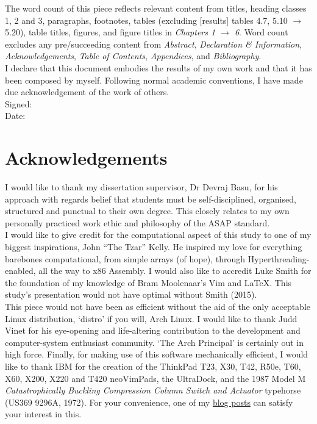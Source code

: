\documentclass[11pt, english]{article}
\begin{document}
	The word count of this piece reflects relevant content from titles, heading classes 1, 2 and 3, paragraphs, footnotes, tables (excluding [results] tables 4.7, 5.10 $\rightarrow$ 5.20), table titles, figures, and figure titles in \textit{Chapters 1 $\rightarrow$ 6}. Word count excludes any pre/succeeding content from \textit{Abstract}, \textit{Declaration \& Information}, \textit{Acknowledgements}, \textit{Table of Contents}, \textit{Appendices}, and \textit{Bibliography}.\\

	I declare that this document embodies the results of my own work and that it has been composed by myself. Following normal academic conventions, I have made due acknowledgement of the work of others.\\

	Signed:\\ 

	Date:

\newpage

	\section*{Acknowledgements}

I would like to thank my dissertation supervisor, Dr Devraj Basu, for his approach with regards belief that students must be self-disciplined, organised, structured and punctual to their own degree. This closely relates to my own personally practiced work ethic and philosophy of the ASAP standard.\\

I would like to give credit for the computational aspect of this study to one of my biggest inspirations, John ``The Tzar'' Kelly. He inspired my love for everything barebones computational, from simple arrays (of hope), through Hyperthreading-enabled, all the way to x86 Assembly. I would also like to accredit Luke Smith for the foundation of my knowledge of Bram Moolenaar’s Vim and {\LaTeX}. This study’s presentation would not have optimal without Smith (2015).\\

This piece would not have been as efficient without the aid of the only acceptable Linux distribution, `distro’ if you will, Arch Linux. I would like to thank Judd Vinet for his eye-opening and life-altering contribution to the development and computer-system enthusiast community. ‘The Arch Principal’ is certainly out in high force. Finally, for making use of this software mechanically efficient, I would like to thank IBM for the creation of the ThinkPad T23, X30, T42, R50e, T60, X60, X200, X220 and T420 neoVimPads, the UltraDock, and the 1987 Model M \textit{Catastrophically Buckling Compression Column Switch and Actuator} typehorse (US369 9296A, 1972). For your convenience, one of my \href{http://lewisbritton.com/Blog/ThinkFlow.html}{blog posts} can satisfy your interest in this. 
\end{document}
